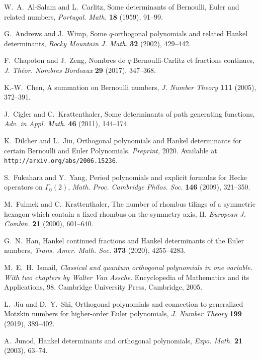 \documentclass{amsart}
\theoremstyle{plain}
\numberwithin{equation}{section}
\begin{document}
\begin{thebibliography}{25}

 W.~A.~Al-Salam and L.~Carlitz, Some determinants of Bernoulli, 
Euler and related numbers, {\it Portugal. Math.} {\bf 18} (1959), 91--99.

 G.~Andrews and J.~Wimp, Some $q$-orthogonal polynomials and 
related Hankel determinants, {\it Rocky Mountain J. Math.} {\bf 32} (2002), 
429--442.

 F.~Chapoton and J.~Zeng, Nombres de $q$-Bernoulli-Carlitz et 
fractions continues, {\it J. Th\'eor. Nombres Bordeaux} {\bf 29} (2017), 
347--368. 

 K.-W.~Chen, A summation on Bernoulli numbers, {\it J. Number 
Theory} {\bf 111} (2005), 372--391.

 J.~Cigler and C.~Krattenthaler, Some determinants of path 
generating functions, {\it Adv. in Appl. Math.} {\bf 46} (2011), 
144--174.

 K.~Dilcher and L.~Jiu, Orthogonal polynomials and Hankel 
determinants for certain Bernoulli and Euler Polynomials. {\it Preprint,} 2020. Available at {\tt http://arxiv.org/abs/2006.15236}.


 S.~Fukuhara and Y.~Yang, Period polynomials and explicit formulas 
for Hecke operators on $\Gamma_0(2)$, {\it Math. Proc. Cambridge Philos. Soc.}
{\bf 146} (2009), 321--350.

 M.~Fulmek and C.~Krattenthaler, The number of rhombus tilings of 
a symmetric hexagon which contain a fixed rhombus on the symmetry axis, II, 
{\it European J. Combin.} {\bf 21} (2000), 601--640.

 G.~N.~Han, Hankel continued fractions and Hankel determinants of 
the Euler numbers, {\it Trans. Amer. Math. Soc.} {\bf 373} (2020), 4255--4283. 

 M.~E.~H.~Ismail, {\it Classical and quantum orthogonal polynomials
in one variable. With two chapters by Walter Van Assche\/}. Encyclopedia of 
Mathematics and its Applications, 98. Cambridge University Press, Cambridge, 
2005.

 L.~Jiu and D.~Y.~Shi, Orthogonal polynomials and connection to 
generalized Motzkin numbers for higher-order Euler polynomials,
{\it J. Number Theory} {\bf 199} (2019), 389--402. 

 A.~Junod, Hankel determinants and orthogonal polynomials,
{\it Expo. Math.} {\bf 21} (2003), 63--74.


\end{thebibliography}
\end{document}
